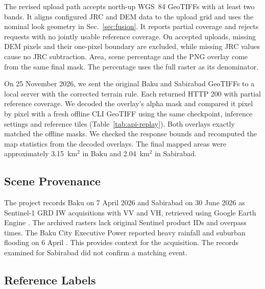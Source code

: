 The revised upload path accepts north-up WGS~84 GeoTIFFs with at least
two bands. It aligns configured JRC and DEM data to the upload grid
and uses the nominal look geometry in Sec.~\ref{sec:fusion}. It
reports partial coverage and rejects requests with no jointly usable
reference coverage. On accepted uploads, missing DEM pixels and
their one-pixel boundary are excluded, while missing JRC values
cause no JRC subtraction. Area, scene percentage and the PNG overlay
come from the same final mask. The percentage uses the full raster as
its denominator.

On 25 November 2026, we sent the original Baku and Sabirabad
GeoTIFFs to a local server with the corrected terrain rule. Each returned HTTP 200 with partial
reference coverage. We decoded the overlay's alpha mask and compared
it pixel by pixel with a fresh offline CLI GeoTIFF using the same
checkpoint, inference settings and reference tiles
(Table~\ref{tab:api-replay}). Both overlays exactly matched the offline
masks. We checked the response bounds and recomputed the map statistics
from the decoded overlays. The final mapped areas were approximately
3.15~km$^2$ in Baku and 2.04~km$^2$ in Sabirabad.

\begin{table}[!htbp]
\caption{Corrected HTTP and CLI replay on the same raster grid.
HTTP and CLI water columns count positive pixels. The last two columns
count flips relative to the previous implementation, for terrain
exclusions and final water separately.}
\label{tab:api-replay}
\centering\small

\end{table}

\subsection{Scene Provenance}

The project records Baku on 7 April 2026 and Sabirabad on 30 June 2026
as Sentinel-1 GRD IW acquisitions with VV and VH, retrieved using
Google Earth Engine \cite{gorelick2017}. The archived rasters lack
original Sentinel product IDs and overpass times. The Baku City
Executive Power reported heavy rainfall and suburban flooding on
6 April \cite{baku2026}. This provides context for the acquisition.
The records examined for Sabirabad did not confirm a matching event.

\subsection{Reference Labels}

